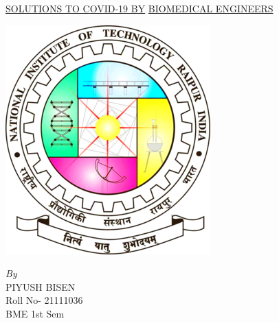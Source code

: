 \documentclass[12pt]{article}
\begin{document}
\begin{center}
\huge\underline{SOLUTIONS TO COVID-19 BY}
\huge\underline{BIOMEDICAL ENGINEERS}
\end{center}
\begin{center}
 \includegraphics[scale=0.7]{nitlogo.png }
\end{center}
\vspace{1cm}
\begin{center}
   \emph{\large By}\\
\Large{ PIYUSH BISEN }\\
\large{Roll No- 21111036}\\
\large{BME 1st Sem}\\
\end{center}
\newpage
\end{document}
